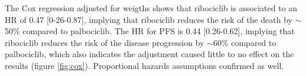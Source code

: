The Cox regression adjusted for weigths shows that ribociclib is associated to an HR of 0.47 [0-26-0.87], implying that ribociclib reduces the risk of the death by $\sim$50\%  compared to palbociclib. The HR for PFS is 0.44 [0.26-0.62], implying that ribociclib reduces the risk of the disease progression by $\sim$60\% compared to palbociclib, which also indicates the adjustment caused little to no effect on the results (figure \ref{fig:cox}). Proportional hazards assumptions confirmed as well.